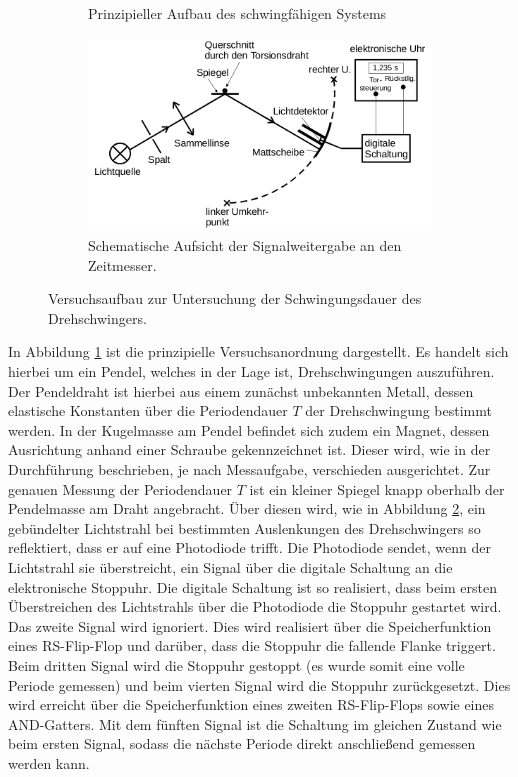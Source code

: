 \begin{figure}
\begin{subfigure}[b]{0.28\textwidth}
		\caption{Prinzipieller Aufbau des schwingfähigen Systems}
		\label{fig:pendel}
	\end{subfigure}
	\begin{subfigure}[b]{0.66\textwidth}
		\includegraphics[width=\textwidth]{Bilder/spiegelding.png}
		\caption{Schematische Aufsicht der Signalweitergabe an den Zeitmesser.}
		\label{fig:licht}
	\end{subfigure}
	\caption{Versuchsaufbau zur Untersuchung der Schwingungsdauer des Drehschwingers. \cite{Anleitung}}
	\label{fig:aufbau_schwinger}
\end{figure}
In Abbildung \ref{fig:pendel} ist die prinzipielle Versuchsanordnung dargestellt. Es handelt sich hierbei um ein Pendel, welches in der Lage ist, Drehschwingungen auszuführen. Der Pendeldraht ist hierbei aus einem zunächst unbekannten Metall, dessen elastische Konstanten über die Periodendauer $T$ der Drehschwingung bestimmt werden. In der Kugelmasse am Pendel befindet sich zudem ein Magnet, dessen Ausrichtung anhand einer Schraube gekennzeichnet ist. Dieser wird, wie in der Durchführung beschrieben, je nach Messaufgabe, verschieden ausgerichtet.
Zur genauen Messung der Periodendauer $T$ ist ein kleiner Spiegel knapp oberhalb der Pendelmasse am Draht angebracht.
Über diesen wird, wie in Abbildung \ref{fig:licht}, ein gebündelter Lichtstrahl bei bestimmten Auslenkungen des Drehschwingers so reflektiert, dass er auf eine Photodiode trifft.
Die Photodiode sendet, wenn der Lichtstrahl sie überstreicht, ein Signal über die digitale Schaltung an die elektronische Stoppuhr.
Die digitale Schaltung ist so realisiert, dass beim ersten Überstreichen des Lichtstrahls über die Photodiode die Stoppuhr gestartet wird.
Das zweite Signal wird ignoriert. Dies wird realisiert über die Speicherfunktion eines RS-Flip-Flop und darüber, dass die Stoppuhr die fallende Flanke triggert.
Beim dritten Signal wird die Stoppuhr gestoppt (es wurde somit eine volle Periode gemessen) und beim vierten Signal wird die Stoppuhr zurückgesetzt.
Dies wird erreicht über die Speicherfunktion eines zweiten RS-Flip-Flops sowie eines AND-Gatters. Mit dem fünften Signal ist die Schaltung im gleichen Zustand wie beim ersten Signal, sodass die nächste Periode direkt anschließend gemessen werden kann.

